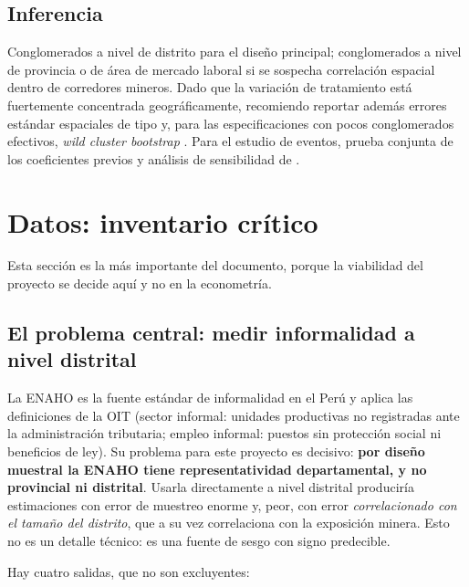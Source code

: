 \documentclass[11pt,a4paper]{article}
\begin{document}
\subsection{Inferencia}
Conglomerados a nivel de distrito para el diseño principal; conglomerados a nivel de provincia o de área de mercado laboral si se sospecha correlación espacial dentro de corredores mineros. Dado que la variación de tratamiento está fuertemente concentrada geográficamente, recomiendo reportar además errores estándar espaciales de tipo \citet{conley1999} y, para las especificaciones con pocos conglomerados efectivos, \emph{wild cluster bootstrap} \citep{cameron2008}. Para el estudio de eventos, prueba conjunta de los coeficientes previos y análisis de sensibilidad de \citet{rambachan2023}.

\section{Datos: inventario crítico}\label{sec:datos}

Esta sección es la más importante del documento, porque la viabilidad del proyecto se decide aquí y no en la econometría.

\subsection{El problema central: medir informalidad a nivel distrital}

La ENAHO es la fuente estándar de informalidad en el Perú y aplica las definiciones de la OIT (sector informal: unidades productivas no registradas ante la administración tributaria; empleo informal: puestos sin protección social ni beneficios de ley). Su problema para este proyecto es decisivo: \textbf{por diseño muestral la ENAHO tiene representatividad departamental, y no provincial ni distrital}. Usarla directamente a nivel distrital produciría estimaciones con error de muestreo enorme y, peor, con error \emph{correlacionado con el tamaño del distrito}, que a su vez correlaciona con la exposición minera. Esto no es un detalle técnico: es una fuente de sesgo con signo predecible.

Hay cuatro salidas, que no son excluyentes:
\end{document}
